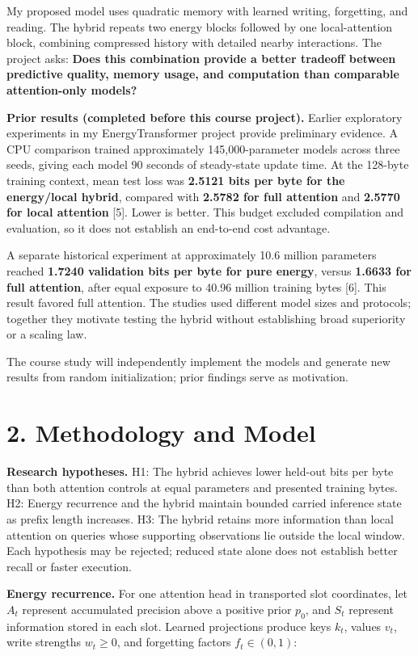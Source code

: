 \documentclass[11pt,letterpaper]{article}
\begin{document}
My proposed model uses quadratic memory with learned writing, forgetting, and reading. The hybrid repeats two energy blocks followed by one local-attention block, combining compressed history with detailed nearby interactions. The project asks: \textbf{Does this combination provide a better tradeoff between predictive quality, memory usage, and computation than comparable attention-only models?}

\textbf{Prior results (completed before this course project).} Earlier exploratory experiments in my EnergyTransformer project provide preliminary evidence. A CPU comparison trained approximately 145,000-parameter models across three seeds, giving each model 90 seconds of steady-state update time. At the 128-byte training context, mean test loss was \textbf{2.5121 bits per byte for the energy/local hybrid}, compared with \textbf{2.5782 for full attention} and \textbf{2.5770 for local attention} [5]. Lower is better. This budget excluded compilation and evaluation, so it does not establish an end-to-end cost advantage.

A separate historical experiment at approximately 10.6 million parameters reached \textbf{1.7240 validation bits per byte for pure energy}, versus \textbf{1.6633 for full attention}, after equal exposure to 40.96 million training bytes [6]. This result favored full attention. The studies used different model sizes and protocols; together they motivate testing the hybrid without establishing broad superiority or a scaling law.

The course study will independently implement the models and generate new results from random initialization; prior findings serve as motivation.

\newpage
\section*{2. Methodology and Model}

\textbf{Research hypotheses.} H1: The hybrid achieves lower held-out bits per byte than both attention controls at equal parameters and presented training bytes. H2: Energy recurrence and the hybrid maintain bounded carried inference state as prefix length increases. H3: The hybrid retains more information than local attention on queries whose supporting observations lie outside the local window. Each hypothesis may be rejected; reduced state alone does not establish better recall or faster execution.

\textbf{Energy recurrence.} For one attention head in transported slot coordinates, let \(A_t\) represent accumulated precision above a positive prior \(p_0\), and \(S_t\) represent information stored in each slot. Learned projections produce keys \(k_t\), values \(v_t\), write strengths \(w_t\geq0\), and forgetting factors \(f_t\in(0,1)\):
\end{document}
